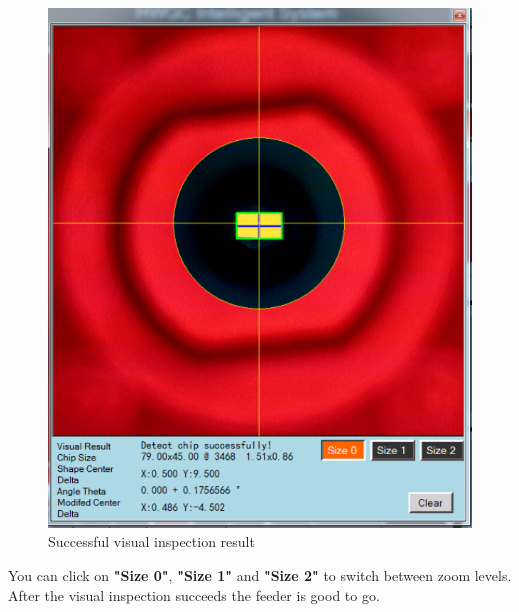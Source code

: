\documentclass[a4paper,10pt]{report}
\begin{document}
 \begin{figure}[!htb]
 \centering
 \includegraphics[width=1\textwidth]{images/scrot29.png}
 \caption{Successful visual inspection result}
\end{figure}
You can click on \textbf{"Size 0"}, \textbf{"Size 1"} and \textbf{"Size 2"} to switch between zoom levels. After the visual inspection succeeds the feeder is good to go.
\newpage
\end{document}
